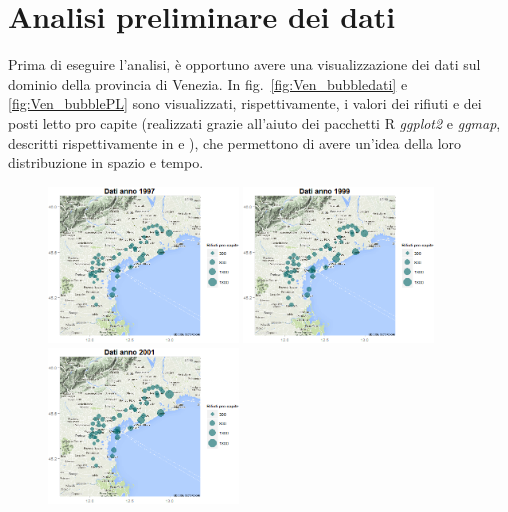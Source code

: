 \documentclass[a4paper,11pt,twoside,openright]{book}							%
\begin{document}
\section{Analisi preliminare dei dati}
Prima di eseguire l'analisi, è opportuno avere una visualizzazione dei dati sul dominio della provincia di Venezia. In fig.~\ref{fig:Ven_bubbledati} e \ref{fig:Ven_bubblePL} sono visualizzati, rispettivamente, i valori dei rifiuti e dei posti letto pro capite (realizzati grazie all'aiuto dei pacchetti R \textit{ggplot2} e \textit{ggmap}, descritti rispettivamente in \cite{package:ggplot2} e \cite{package:ggmap}), che permettono di avere un'idea della loro distribuzione in spazio e tempo.
\newpage
\begin{figure}[H]
	\centering
	\includegraphics[trim=0cm 0cm 0cm 0cm,clip=true,width=0.45\textwidth]{Immagini/venezia_dati/Dati1997.png}
	\includegraphics[trim=0cm 0cm 0cm 0cm,clip=true,width=0.45\textwidth]{Immagini/venezia_dati/Dati1999.png}
	\includegraphics[trim=0cm 0cm 0cm 0cm,clip=true,width=0.45\textwidth]{Immagini/venezia_dati/Dati2001.png}

\end{figure}
\end{document}
